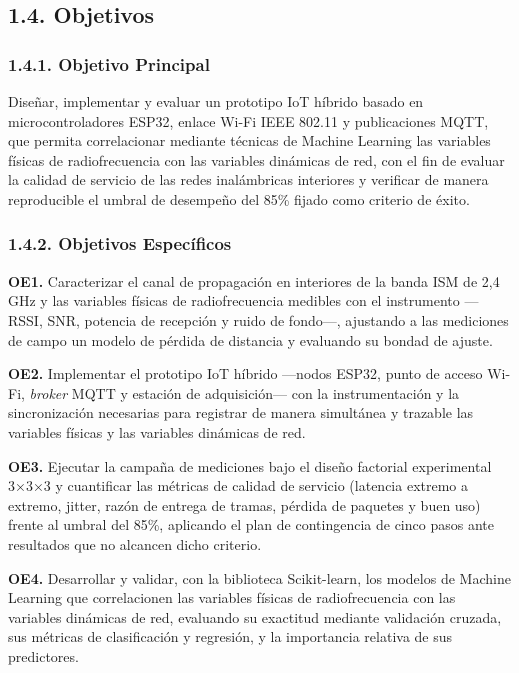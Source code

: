\documentclass[
  12pt,
]{article}
\begin{document}
\subsection{1.4. Objetivos}\label{objetivos}

\subsubsection{1.4.1. Objetivo Principal}\label{objetivo-principal}

Diseñar, implementar y evaluar un prototipo IoT híbrido basado en
microcontroladores ESP32, enlace Wi-Fi IEEE 802.11 y publicaciones MQTT,
que permita correlacionar mediante técnicas de Machine Learning las
variables físicas de radiofrecuencia con las variables dinámicas de red,
con el fin de evaluar la calidad de servicio de las redes inalámbricas
interiores y verificar de manera reproducible el umbral de desempeño del
85\% fijado como criterio de éxito.

\subsubsection{1.4.2. Objetivos
Específicos}\label{objetivos-especuxedficos}

\textbf{OE1.} Caracterizar el canal de propagación en interiores de la
banda ISM de 2,4 GHz y las variables físicas de radiofrecuencia medibles
con el instrumento —RSSI, SNR, potencia de recepción y ruido de fondo—,
ajustando a las mediciones de campo un modelo de pérdida de distancia y
evaluando su bondad de ajuste.

\textbf{OE2.} Implementar el prototipo IoT híbrido —nodos ESP32, punto
de acceso Wi-Fi, \emph{broker} MQTT y estación de adquisición— con la
instrumentación y la sincronización necesarias para registrar de manera
simultánea y trazable las variables físicas y las variables dinámicas de
red.

\textbf{OE3.} Ejecutar la campaña de mediciones bajo el diseño factorial
experimental 3×3×3 y cuantificar las métricas de calidad de servicio
(latencia extremo a extremo, jitter, razón de entrega de tramas, pérdida
de paquetes y buen uso) frente al umbral del 85\%, aplicando el plan de
contingencia de cinco pasos ante resultados que no alcancen dicho
criterio.

\textbf{OE4.} Desarrollar y validar, con la biblioteca Scikit-learn, los
modelos de Machine Learning que correlacionen las variables físicas de
radiofrecuencia con las variables dinámicas de red, evaluando su
exactitud mediante validación cruzada, sus métricas de clasificación y
regresión, y la importancia relativa de sus predictores.
\end{document}
